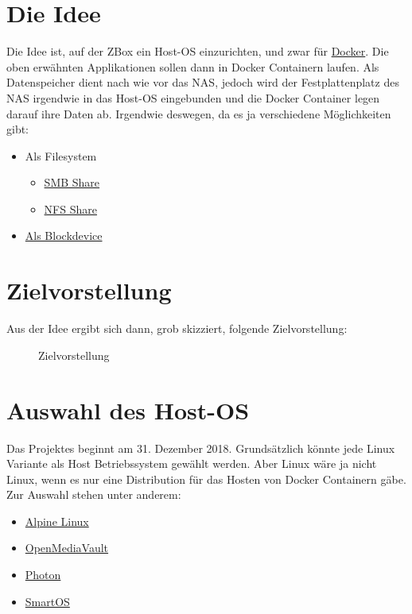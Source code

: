 \documentclass[12pt,a4paper,ngerman]{article}
\newcommand{\jpaimg}[2]{\begin{figure}[H]\centering\fbox{\texttt{[image: \#1]}}\caption{#2}\label{fig:#2}\end{figure}}
\begin{document}
\section{Die Idee}
Die Idee ist, auf der ZBox ein Host-OS einzurichten, und zwar für
\href{https://de.wikipedia.org/wiki/Docker_(Software)}{Docker}. Die oben
erwähnten Applikationen sollen dann in Docker Containern laufen. Als
Datenspeicher dient nach wie vor das NAS, jedoch wird der Festplattenplatz des
NAS irgendwie in das Host-OS eingebunden und die Docker Container legen darauf
ihre Daten ab. Irgendwie deswegen, da es ja verschiedene Möglichkeiten gibt:

\begin{itemize}
    \item Als Filesystem
          \begin{itemize}
              \item \href{https://de.wikipedia.org/wiki/Server_Message_Block}{SMB Share}
              \item \href{https://de.wikipedia.org/wiki/Network_File_System}{NFS Share}
          \end{itemize}
    \item \href{https://de.wikipedia.org/wiki/ISCSI}{Als Blockdevice}
\end{itemize}

\section{Zielvorstellung}
Aus der Idee ergibt sich dann, grob skizziert, folgende Zielvorstellung:

\jpaimg{./images/ZBoxDS411Slim.png}{Zielvorstellung}

\section{Auswahl des Host-OS}
Das Projektes beginnt am 31. Dezember 2018. Grundsätzlich könnte jede Linux
Variante als Host Betriebssystem gewählt werden. Aber Linux wäre ja nicht
Linux, wenn es nur eine Distribution für das Hosten von Docker Containern gäbe.
Zur Auswahl stehen unter anderem:

\begin{itemize}
    \item \href{https://alpinelinux.org/}{Alpine Linux}
    \item \href{https://www.openmediavault.org/}{OpenMediaVault}
    \item \href{https://vmware.github.io/photon/}{Photon}
    \item \href{https://wiki.smartos.org/display/DOC/Welcome+to+SmartOS}{SmartOS}
\end{itemize}
\end{document}
